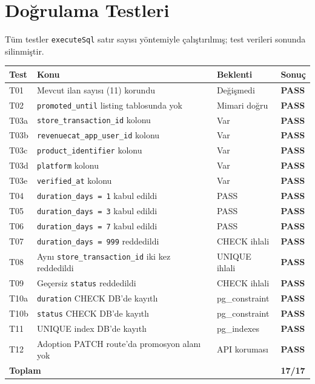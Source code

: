 \documentclass[12pt,a4paper]{article}
\begin{document}
\section{Doğrulama Testleri}

Tüm testler \texttt{executeSql} satır sayısı yöntemiyle çalıştırılmış;
test verileri sonunda silinmiştir.

\begin{center}
\begin{tabular}{llll}
  \toprule
  \textbf{Test} & \textbf{Konu} & \textbf{Beklenti} & \textbf{Sonuç}\\
  \midrule
  T01 & Mevcut ilan sayısı (11) korundu & Değişmedi & \textcolor{successgreen}{\bfseries PASS}\\
  T02 & \texttt{promoted\_until} listing tablosunda yok & Mimari doğru & \textcolor{successgreen}{\bfseries PASS}\\
  T03a & \texttt{store\_transaction\_id} kolonu & Var & \textcolor{successgreen}{\bfseries PASS}\\
  T03b & \texttt{revenuecat\_app\_user\_id} kolonu & Var & \textcolor{successgreen}{\bfseries PASS}\\
  T03c & \texttt{product\_identifier} kolonu & Var & \textcolor{successgreen}{\bfseries PASS}\\
  T03d & \texttt{platform} kolonu & Var & \textcolor{successgreen}{\bfseries PASS}\\
  T03e & \texttt{verified\_at} kolonu & Var & \textcolor{successgreen}{\bfseries PASS}\\
  T04 & \texttt{duration\_days = 1} kabul edildi & PASS & \textcolor{successgreen}{\bfseries PASS}\\
  T05 & \texttt{duration\_days = 3} kabul edildi & PASS & \textcolor{successgreen}{\bfseries PASS}\\
  T06 & \texttt{duration\_days = 7} kabul edildi & PASS & \textcolor{successgreen}{\bfseries PASS}\\
  T07 & \texttt{duration\_days = 999} reddedildi & CHECK ihlali & \textcolor{successgreen}{\bfseries PASS}\\
  T08 & Aynı \texttt{store\_transaction\_id} iki kez reddedildi & UNIQUE ihlali & \textcolor{successgreen}{\bfseries PASS}\\
  T09 & Geçersiz \texttt{status} reddedildi & CHECK ihlali & \textcolor{successgreen}{\bfseries PASS}\\
  T10a & \texttt{duration} CHECK DB'de kayıtlı & pg\_constraint & \textcolor{successgreen}{\bfseries PASS}\\
  T10b & \texttt{status} CHECK DB'de kayıtlı & pg\_constraint & \textcolor{successgreen}{\bfseries PASS}\\
  T11 & UNIQUE index DB'de kayıtlı & pg\_indexes & \textcolor{successgreen}{\bfseries PASS}\\
  T12 & Adoption PATCH route'da promosyon alanı yok & API koruması & \textcolor{successgreen}{\bfseries PASS}\\
  \midrule
  \multicolumn{3}{l}{\textbf{Toplam}} & \textcolor{successgreen}{\bfseries 17/17}\\
  \bottomrule
\end{tabular}
\end{center}
\end{document}
